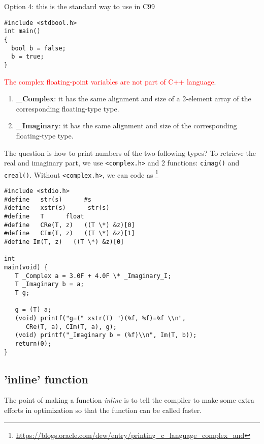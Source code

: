Option 4: this is the standard way to use in C99
\begin{lstlisting}
#include <stdbool.h>
int main()
{
  bool b = false;
  b = true;
}
\end{lstlisting}


\textcolor{red}{The complex floating-point variables are not part of C++
language}.
\begin{enumerate}
  \item  {\bf \_Complex}: it has the same alignment and size of a 2-element array of the
corresponding floating-type type.

  \item {\bf \_Imaginary}: it has the same alignment and size of the
  corresponding floating-type type.
\end{enumerate}


The question is how to print numbers of the two following types? To retrieve the
real and imaginary part, we use \verb!<complex.h>! and 2 functions:
\verb!cimag()! and \verb!creal()!. Without \verb!<complex.h>!, we can code as
\footnote{\url{https://blogs.oracle.com/dew/entry/printing_c_language_complex_and}}
\begin{lstlisting}
#include <stdio.h>
#define   str(s)      #s
#define   xstr(s)      str(s)
#define   T      float
#define   CRe(T, z)   ((T \*) &z)[0]
#define   CIm(T, z)   ((T \*) &z)[1]
#define Im(T, z)   ((T \*) &z)[0]

int
main(void) {
   T _Complex a = 3.0F + 4.0F \* _Imaginary_I;
   T _Imaginary b = a;
   T g;

   g = (T) a;
   (void) printf("g=(" xstr(T) ")(%f, %f)=%f \\n",
      CRe(T, a), CIm(T, a), g);
   (void) printf("_Imaginary b = (%f)\\n", Im(T, b));
   return(0);
}

\end{lstlisting}


\subsection{'inline' function}
\label{sec:inline_C99}

The point of making a function {\it inline} is to tell the compiler to make some
extra efforts in optimization so that the function can be called faster. 

